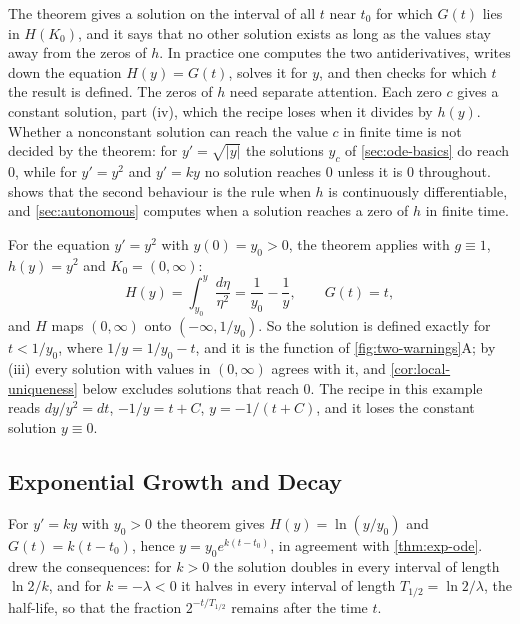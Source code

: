 The theorem gives a solution on the interval of all $t$ near $t_0$ for which $G(t)$ lies in $H(K_0)$, and it says that no other solution exists as long as the values stay away from the zeros of $h$. In practice one computes the two antiderivatives, writes down the equation $H(y)=G(t)$, solves it for $y$, and then checks for which $t$ the result is defined. The zeros of $h$ need separate attention. Each zero $c$ gives a constant solution, part (iv), which the recipe loses when it divides by $h(y)$. Whether a nonconstant solution can reach the value $c$ in finite time is not decided by the theorem: for $y'=\sqrt{|y|}$ the solutions $y_c$ of \cref{sec:ode-basics} do reach $0$, while for $y'=y^2$ and $y'=ky$ no solution reaches $0$ unless it is $0$ throughout.  shows that the second behaviour is the rule when $h$ is continuously differentiable, and \cref{sec:autonomous} computes when a solution reaches a zero of $h$ in finite time.

For the equation $y'=y^2$ with $y(0)=y_0>0$, the theorem applies with $g\equiv1$, $h(y)=y^2$ and $K_0=(0,\infty)$:
\[
H(y)=\int_{y_0}^y\frac{d\eta}{\eta^2}=\frac1{y_0}-\frac1y,\qquad G(t)=t ,
\]
and $H$ maps $(0,\infty)$ onto $(-\infty,1/y_0)$. So the solution is defined exactly for $t<1/y_0$, where $1/y=1/y_0-t$, and it is the function of \cref{fig:two-warnings}A; by (iii) every solution with values in $(0,\infty)$ agrees with it, and \cref{cor:local-uniqueness} below excludes solutions that reach $0$. The recipe in this example reads $dy/y^2=dt$, $-1/y=t+C$, $y=-1/(t+C)$, and it loses the constant solution $y\equiv0$.

\subsection{Exponential Growth and Decay}

For $y'=ky$ with $y_0>0$ the theorem gives $H(y)=\ln(y/y_0)$ and $G(t)=k(t-t_0)$, hence $y=y_0e^{k(t-t_0)}$, in agreement with \cref{thm:exp-ode}.  drew the consequences: for $k>0$ the solution doubles in every interval of length $\ln2/k$, and for $k=-\lambda<0$ it halves in every interval of length $T_{1/2}=\ln2/\lambda$, the half-life, so that the fraction $2^{-t/T_{1/2}}$ remains after the time $t$.

